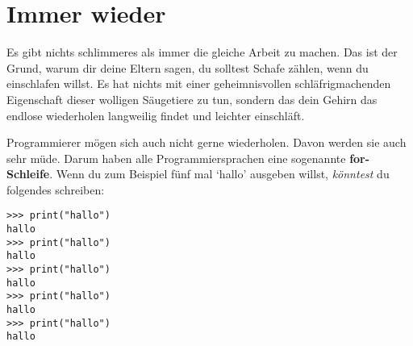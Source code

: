 

\chapter{Immer wieder}\label{ch:againandagain}

Es gibt nichts schlimmeres als immer die gleiche Arbeit zu machen. Das ist der Grund, warum dir deine Eltern sagen, du solltest Schafe zählen, wenn du einschlafen willst. Es hat nichts mit einer geheimnisvollen schläfrigmachenden Eigenschaft dieser wolligen Säugetiere zu tun, sondern das dein Gehirn das endlose wiederholen langweilig findet und leichter einschläft.
\par
Programmierer mögen sich auch nicht gerne wiederholen. Davon werden sie auch sehr müde. Darum haben alle Programmiersprachen eine sogenannte \textbf{for-Schleife}. Wenn du zum Beispiel fünf mal `hallo' ausgeben willst, \emph{könntest} du folgendes schreiben:

\begin{listing}
\begin{verbatim}
>>> print("hallo")
hallo
>>> print("hallo")
hallo
>>> print("hallo")
hallo
>>> print("hallo")
hallo
>>> print("hallo")
hallo
\end{verbatim}
\end{listing}

